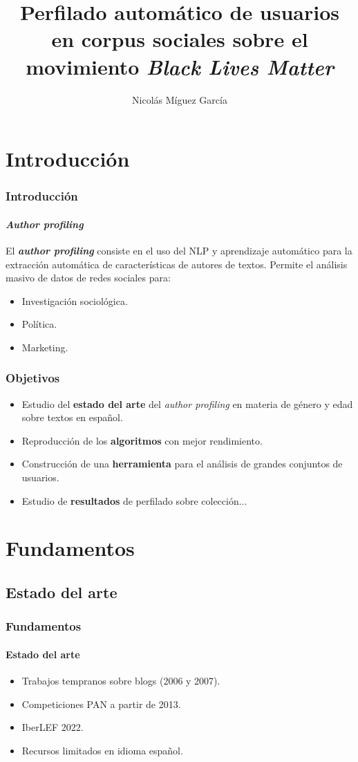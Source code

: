 \documentclass{beamer}
\title[Trabajo Fin de Grado]{Perfilado automático de usuarios en corpus sociales sobre el movimiento \textit{Black Lives Matter}}
\author{Nicolás Míguez García}
\institute[GEI]{Grado en Ingeniería Informática (Mención en Computación) \\
	\vspace{3mm}
	Patricia Martín Rodilla \\ 
	David Otero Freijeiro 
}
\date[\today]{}
\begin{document}
	
	\frame{\titlepage}
		
\section{Introducción}
		\begin{frame}
			\frametitle{Introducción}
			\framesubtitle{\textit{Author profiling}}
			El \textbf{\textit{author profiling}} consiste en el uso del NLP y aprendizaje automático para la extracción automática de características de autores de textos. \pause
			Permite el análisis masivo de datos de redes sociales para:\pause
			\begin{itemize}
				\item Investigación sociológica.
				\item Política.
				\item Marketing.
			\end{itemize}
		\end{frame}
		
		\begin{frame}
			\frametitle{Objetivos}
			\begin{itemize}
				\item Estudio del \textbf{estado del arte} del \textit{author profiling} en materia de género y edad sobre textos en {español}.
				\item {Reproducción de los \textbf{algoritmos}} con mejor rendimiento.
				\item Construcción de una \textbf{herramienta} para el análisis de grandes conjuntos de usuarios.
				\item Estudio de \textbf{resultados} de perfilado sobre colección...
			\end{itemize}
		\end{frame}
		
\section{Fundamentos}
		\subsection{Estado del arte}
		\begin{frame}
			\frametitle{Fundamentos}
			\framesubtitle{Estado del arte}
			\begin{itemize}
				\item Trabajos tempranos sobre blogs (2006 y 2007). \pause
				\item Competiciones PAN a partir de 2013. \pause
				\item IberLEF 2022.\pause
				\item Recursos limitados en idioma español.\pause
			\end{itemize}
		\end{frame}
\end{document}
